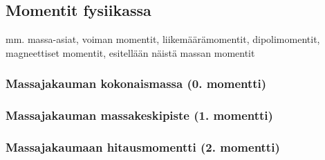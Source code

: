 \documentclass[../integrointiopas.tex]{subfiles}
\begin{document}
	\subsection{Momentit fysiikassa}
	
	mm. massa-asiat, voiman momentit, liikemäärämomentit, dipolimomentit, magneettiset momentit, esitellään näistä massan momentit
	
	\subsubsection{Massajakauman kokonaismassa (0. momentti)}
	
	\subsubsection{Massajakauman massakeskipiste (1. momentti)}
	
	\subsubsection{Massajakaumaan hitausmomentti (2. momentti)}
\end{document}
